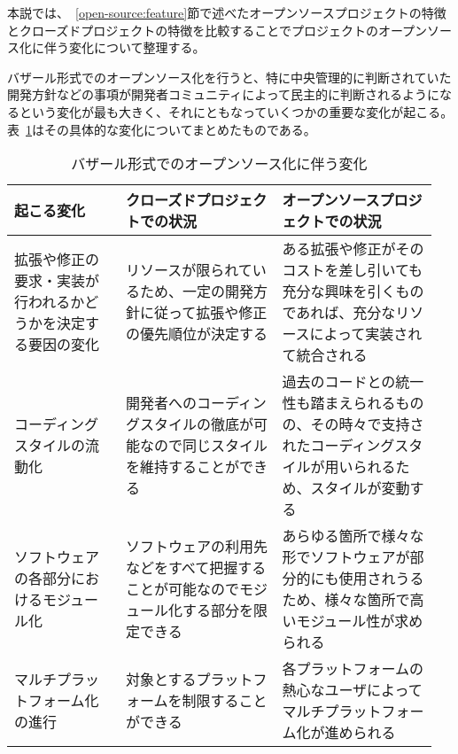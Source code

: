 本説では、~\ref{open-source:feature}節で述べたオープンソースプロジェクトの特徴とクローズドプロジェクトの特徴を比較することでプロジェクトのオープンソース化に伴う変化について整理する。

バザール形式でのオープンソース化を行うと、特に中央管理的に判断されていた開発方針などの事項が開発者コミュニティによって民主的に判断されるようになるという変化が最も大きく、それにともなっていくつかの重要な変化が起こる。
表~\ref{table:open-source-change}はその具体的な変化についてまとめたものである。

\begin{table}[!hbtp]
    \begin{center}
        \caption{バザール形式でのオープンソース化に伴う変化}
        \begin{tabular}{|p{0.25\linewidth}|p{0.35\linewidth}|p{0.35\linewidth}|}
            \hline
            起こる変化 & クローズドプロジェクトでの状況 & オープンソースプロジェクトでの状況 \\
            \hline
            \hline
            拡張や修正の要求・実装が行われるかどうかを決定する要因の変化 & リソースが限られているため、一定の開発方針に従って拡張や修正の優先順位が決定する & ある拡張や修正がそのコストを差し引いても充分な興味を引くものであれば、充分なリソースによって実装されて統合される \\
            \hline
            コーディングスタイルの流動化 & 開発者へのコーディングスタイルの徹底が可能なので同じスタイルを維持することができる & 過去のコードとの統一性も踏まえられるものの、その時々で支持されたコーディングスタイルが用いられるため、スタイルが変動する \\
            \hline
            ソフトウェアの各部分におけるモジュール化 & ソフトウェアの利用先などをすべて把握することが可能なのでモジュール化する部分を限定できる & あらゆる箇所で様々な形でソフトウェアが部分的にも使用されうるため、様々な箇所で高いモジュール性が求められる \\
            \hline
            マルチプラットフォーム化の進行 & 対象とするプラットフォームを制限することができる & 各プラットフォームの熱心なユーザによってマルチプラットフォーム化が進められる \\
            \hline
        \end{tabular}
        \label{table:open-source-change}
    \end{center}
\end{table}

